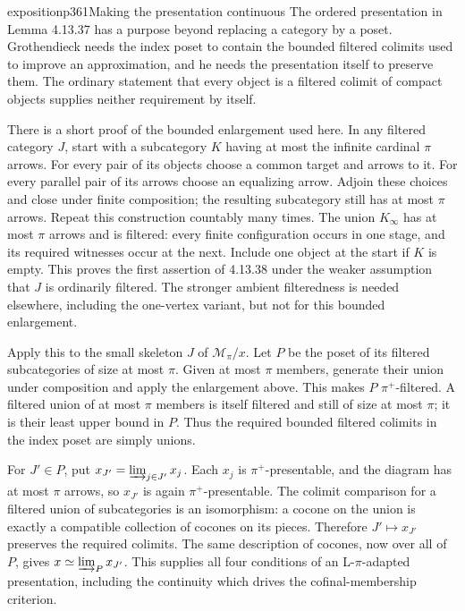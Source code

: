 \begin{dcomment}{exposition}{p361}{Making the presentation continuous}
The ordered presentation in Lemma 4.13.37 has a purpose beyond replacing a category by a poset. Grothendieck needs the index poset to contain the bounded filtered colimits used to improve an approximation, and he needs the presentation itself to preserve them. The ordinary statement that every object is a filtered colimit of compact objects supplies neither requirement by itself.

There is a short proof of the bounded enlargement used here. In any filtered category $J$, start with a subcategory $K$ having at most the infinite cardinal $\pi$ arrows. For every pair of its objects choose a common target and arrows to it. For every parallel pair of its arrows choose an equalizing arrow. Adjoin these choices and close under finite composition; the resulting subcategory still has at most $\pi$ arrows. Repeat this construction countably many times. The union $K_\infty$ has at most $\pi$ arrows and is filtered: every finite configuration occurs in one stage, and its required witnesses occur at the next. Include one object at the start if $K$ is empty. This proves the first assertion of 4.13.38 under the weaker assumption that $J$ is ordinarily filtered. The stronger ambient filteredness is needed elsewhere, including the one-vertex variant, but not for this bounded enlargement.

Apply this to the small skeleton $J$ of $\mathcal M_\pi/x$. Let $P$ be the poset of its filtered subcategories of size at most $\pi$. Given at most $\pi$ members, generate their union under composition and apply the enlargement above. This makes $P$ $\pi^+$-filtered. A filtered union of at most $\pi$ members is itself filtered and still of size at most $\pi$; it is their least upper bound in $P$. Thus the required bounded filtered colimits in the index poset are simply unions.

For $J'\in P$, put $x_{J'}=\varinjlim_{j\in J'}x_j$. Each $x_j$ is $\pi^+$-presentable, and the diagram has at most $\pi$ arrows, so $x_{J'}$ is again $\pi^+$-presentable. The colimit comparison for a filtered union of subcategories is an isomorphism: a cocone on the union is exactly a compatible collection of cocones on its pieces. Therefore $J'\mapsto x_{J'}$ preserves the required colimits. The same description of cocones, now over all of $P$, gives $x\simeq\varinjlim_Px_{J'}$. This supplies all four conditions of an L-$\pi$-adapted presentation, including the continuity which drives the cofinal-membership criterion.


\end{dcomment}
